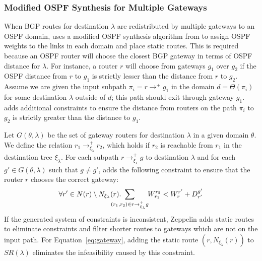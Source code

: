 %
%
%
\subsubsection{Modified OSPF Synthesis for Multiple Gateways}
When BGP routes for destination $\lambda$ 
are redistributed by multiple gateways to an 
OSPF domain, \name uses a modified OSPF synthesis
algorithm from  
to assign OSPF weights to the links in each domain
and place static routes. 
This is 
required because an OSPF router will choose
the closest BGP gateway in terms of OSPF distance 
for $\lambda$. For instance, a router $r$ will choose
from gateways $g_1$ over $g_2$ if the OSPF distance from $r$ to $g_1$ 
is strictly lesser than the distance from $r$ to $g_2$. 
Assume we are given the input subpath $\pi_i=r \rightarrow^+ g_1$ in
the domain $d=\Theta(\pi_i)$ for some destination $\lambda$ outside
of $d$; this path should exit through gateway $g_1$. 
\name adds additional
constraints to ensure the distance  from routers
on the path $\pi_i$ to $g_2$ is strictly
greater than the distance to $g_1$. 

Let $G(\theta, \lambda)$ be the set of gateway
routers for destination $\lambda$ in a given domain $\theta$. 
We define the relation $r_1 \rightarrow^+_{\xi_{\lambda}} r_2$, which holds if
$r_2$ is reachable from $r_1$ in the destination tree $\xi_\lambda$.
For each subpath $r \rightarrow^+_{\xi_{\lambda}} g$ to destination $\lambda$
and for each $g' \in G(\theta, \lambda)$ such that $g\neq g'$,
\name adds the following constraint
to ensure that the  router $r$
chooses the correct gateway: 
\begin{equation} \label{eq:gateway}
\forall r' \in N(r) \setminus N_{\xi_\lambda}(r).~
\sum_{\mathclap{\substack{(r_1,r_2) \in r \rightarrow^+_{\xi_{\lambda}} g }}}~~~~~W_{r_1}^{r_2} < 
W_r^{r'} + D_{r'}^{g'} 
\end{equation}
If the generated system of
constraints is inconsistent, Zeppelin adds
static routes to eliminate constraints
and filter shorter routes to gateways which are
not on the input path. For Equation~\ref{eq:gateway},
adding the static route $(r, N_{\xi_\lambda}(r))$ to $SR(\lambda)$
 eliminates the infeasibility caused by this constraint.
